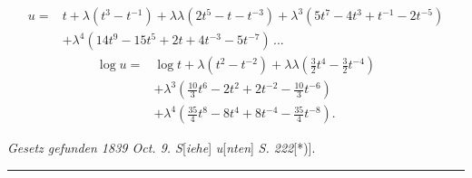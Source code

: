 \clearpage{}
\[\begin{aligned}
u={}&t+\lambda(t^3-t^{-1})+\lambda\lambda(2t^5-t-t^{-3})+\lambda^3(5t^7-4t^3+t^{-1}-2t^{-5})\\
&+\lambda^4(14t^9-15t^5+2t+4t^{-3}-5t^{-7})\,{.}{.}{.}
\end{aligned}\]
\[\begin{aligned}
\log u={}&\log t+\lambda(t^2-t^{-2})+\lambda\lambda(\tfrac32t^4-\tfrac32t^{-4})\\
&+\lambda^3(\tfrac{10}3t^6-2t^2+2t^{-2}-\tfrac{10}3t^{-6})\\
&+\lambda^4(\tfrac{35}4t^8-8t^4+8t^{-4}-\tfrac{35}4t^{-8}).
\end{aligned}\]
\begin{center}
\textit{Gesetz gefunden 1839 Oct. 9. S}[\textit{iehe}] \textit{u}[\textit{nten}] \textit{S. 222}[*)].
\end{center}
\ClosingRule
\par\bigskip\noindent\rule{.25\linewidth}{.4pt}\par\smallskip
{\small\par{}\par}
\clearpage
\endgroup
